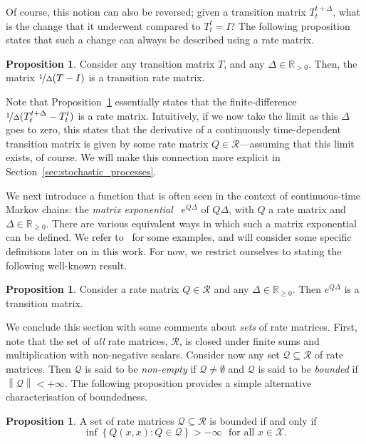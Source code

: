 \documentclass[10pt,a4paper]{paper}
\theoremstyle{definition}
\newtheorem{proposition}[theorem]{Proposition}
\newcommand{\reals}{\mathbb{R}}
\newcommand{\realspos}{\reals_{>0}}
\newcommand{\realsnonneg}{\reals_{\geq 0}}
\newcommand{\states}{\mathcal{X}}
\newcommand{\rateset}{\mathcal{Q}}
\newcommand{\norm}[1]{\left\lVert #1 \right\rVert}
\begin{document}
Of course, this notion can also be reversed; given a transition matrix $T_t^{t+\Delta}$, what is the change that it underwent compared to $T_t^t=I$? The following proposition states that such a change can always be described using a rate matrix.
\begin{proposition}\label{prop:rate_from_stochastic_matrix}
Consider any transition matrix $T$, and any $\Delta\in\realspos$. Then, the matrix $\nicefrac{1}{\Delta}(T-I)$ is a transition rate matrix.
\end{proposition}
Note that Proposition~\ref{prop:rate_from_stochastic_matrix} essentially states that the finite-difference $\nicefrac{1}{\Delta}(T_t^{t+\Delta} - T_t^t)$ is a rate matrix. Intuitively, if we now take the limit as this $\Delta$ goes to zero, this states that the derivative of a continuously time-dependent transition matrix is given by some rate matrix $Q\in\mathcal{R}$---assuming that this limit exists, of course. We will make this connection more explicit in Section~\ref{sec:stochastic_processes}.

We next introduce a function that is often seen in the context of continuous-time Markov chains: the \emph{matrix exponential}~\cite{van2006study} $e^{Q\Delta}$ of $Q \Delta$, with $Q$ a rate matrix and $\Delta\in\reals_{\geq0}$. %
There are various equivalent ways in which such a matrix exponential can be defined. We refer to~\cite{van2006study} for some examples, and will consider some specific definitions later on in this work.
For now, we restrict ourselves to stating the following well-known result.
\begin{proposition}\cite[Theorem 2.1.2]{norris1998markov}\label{prop:stochastic_from_exponential}
Consider a rate matrix $Q\in\mathcal{R}$ and any $\Delta\in\realsnonneg$. Then $e^{Q\Delta}$ is a transition matrix.
\end{proposition}

We conclude this section with some comments about \emph{sets} of rate matrices. First, note that the set of \emph{all} rate matrices, $\mathcal{R}$, is closed under finite sums and multiplication with non-negative scalars. Consider now any set $\rateset\subseteq\mathcal{R}$ of rate matrices. Then $\rateset$ is said to be \emph{non-empty} if $\rateset\neq\emptyset$ and $\rateset$ is said to be \emph{bounded} if $\norm{\rateset}<+\infty$. The following proposition provides a simple alternative characterisation of boundedness.

\begin{proposition}\label{prop:alternativedefforbounded}
A set of rate matrices $\rateset\subseteq\mathcal{R}$ is bounded if and only if
\begin{equation}\label{eq:alternative_bounded}
\inf\left\{Q(x,x)\colon Q\in\rateset\right\}>-\infty\text{~~for all $x\in\states$.}
\end{equation}
\end{proposition}
\end{document}
